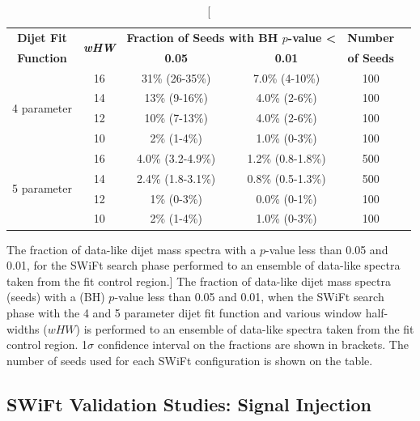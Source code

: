 \begin{table}[!htb]
\centering
\begin{tabular}{|c|c||c|c|c|c|}
  \hline
   \textbf{Dijet Fit}  & \multirow{2}{*}{\textbf{\textit{wHW}}} &\multicolumn{2}{c|}{\textbf{Fraction of Seeds with BH \mbox{$p$-value} \textless}} &   \textbf{Number}   \\ \cline{3-4} 
   \textbf{Function}   &                        & \textbf{0.05}                & \textbf{0.01}                                               &  \textbf{of Seeds}  \\ 
  \hline
  \multirow{4}{*}{4 parameter} &   16 &  31\%   (26-35\%)   &  7.0\% (4-10\%)  & 100  \\
   &   14 &  13\%   (9-16\%)    &  4.0\% (2-6\%)   & 100  \\
   &   12 &  10\%   (7-13\%)    &  4.0\% (2-6\%)   & 100  \\
   &   10 &  2\%   (1-4\%)      &  1.0\% (0-3\%)   & 100  \\
  \hline
  \multirow{4}{*}{5 parameter} &   16 &  4.0\% (3.2-4.9\%)  &  1.2\% (0.8-1.8\%) & 500  \\
  &   14 &  2.4\% (1.8-3.1\%)  &  0.8\% (0.5-1.3\%) & 500  \\
  &   12 &  1\%   (0-3\%)      &  0.0\%  (0-1\%)  & 100  \\
  &   10 &  2\%   (1-4\%)      &  1.0\%  (0-3\%)  & 100  \\
  \hline
\end{tabular}
\caption
    [ The fraction of data-like dijet mass spectra
      with a \bh{} \mbox{$p$-value} less than 0.05 and 0.01,
      for the SWiFt search phase performed to an ensemble of data-like spectra
      taken from the \lm{} fit control region.]
    {\label{tab:bumpH_lm_spuriousSignal}
      The fraction of data-like dijet mass spectra (seeds) 
      with a \bh{} (BH) \mbox{$p$-value} less than 0.05 and 0.01,
      when the SWiFt search phase with the 4 and 5 parameter dijet fit function
      and various window half-widths ($wHW$) is performed to an ensemble of data-like spectra
      taken from the \lm{} fit control region.
      1$\sigma$ confidence interval on the fractions are shown in brackets.
      The number of seeds used for each SWiFt configuration is shown on the table.}
    \vspace{-0.5em}
\end{table}
\newpage

\subsection{SWiFt Validation Studies: Signal Injection}
\label{sec:bkg-full_signalInj}


